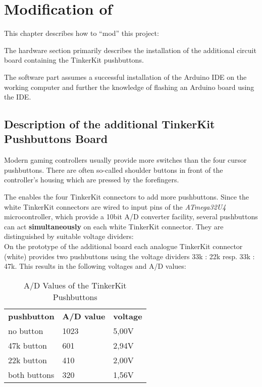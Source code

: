 \chapter{Modification of \Bezeichnung}
This chapter describes how to ``mod'' this project:
\begin{compactitem}
	\item The hardware section primarily describes the installation of the additional circuit board containing the TinkerKit pushbuttons.
	\item The software part assumes a successful installation of the Arduino IDE on the working computer and further the knowledge of flashing an Arduino board using the IDE.
\end{compactitem}

\section{Description of the additional TinkerKit Pushbuttons Board}
\label{sect:TinkerKitBoard}
Modern gaming controllers usually provide more switches than the
four cursor pushbuttons. There are often so-called shoulder buttons
in front of the controller's housing which are pressed by
the forefingers.

The {\Bezeichnung} enables the four TinkerKit connectors to add more
pushbuttons. Since the white TinkerKit connectors are wired to input
pins of the \textit{ATmega32U4} microcontroller, which provide a 10bit
A/D converter facility, several pushbuttons can act
\textbf{simultaneously} on each white TinkerKit connector. They are
distinguished by suitable voltage dividers:\\
On the prototype of the additional board each analogue TinkerKit
connector (white) provides two pushbuttons using the voltage dividers
33k : 22k resp. 33k : 47k. This results in the following voltages and
A/D values:

\begin{table}[h]
\centering
\renewcommand{\arraystretch}{1.5}
\begin{tabular}{p{}p{}p{}}
	\textbf{pushbutton}	&	\textbf{A/D value}	&	\textbf{voltage}\\
	no button			&	1023				&	5,00V\\
	47k button			&	601					&	2,94V\\
	22k button			&	410					&	2,00V\\
	both buttons		&	320					&	1,56V\\
\end{tabular}
\vspace{0.5cm}
\caption{A/D Values of the TinkerKit Pushbuttons}
\end{table}

